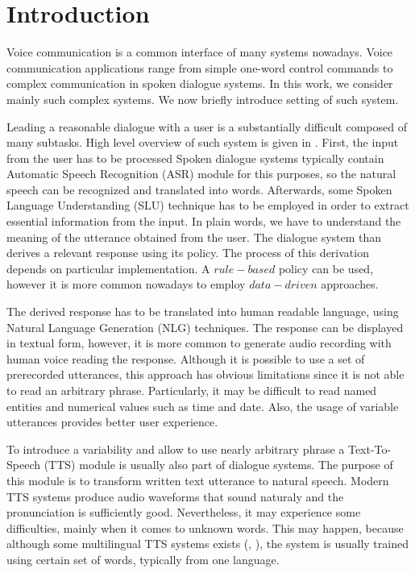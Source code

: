 \chapter{Introduction}
Voice communication is a common interface of many systems nowadays.
Voice communication applications range from simple one-word control commands to complex communication in spoken dialogue systems.
In this work, we consider mainly such complex systems.
We now briefly introduce setting of such system.
\par
Leading a reasonable dialogue with a user is a substantially difficult composed of many subtasks.
High level overview of such system is given in .
First, the input from the user has to be processed
Spoken dialogue systems typically contain Automatic Speech Recognition (ASR) module for this purposes, so the natural speech can be recognized and translated into words.
Afterwards, some Spoken Language Understanding (SLU) technique has to be employed in order to extract essential information from the input.
In plain words, we have to understand the meaning of the utterance obtained from the user.
The dialogue system than derives a relevant response using its policy.
The process of this derivation depends on particular implementation.
A $rule-based$ policy can be used, however it is more common nowadays to employ $data-driven$ approaches.
\par
The derived response has to be translated into human readable language, using Natural Language Generation (NLG) techniques.
The response can be displayed in textual form, however, it is more common to generate audio recording with human voice reading the response.
Although it is possible to use a set of prerecorded utterances, this approach has obvious limitations since it is not able to read an arbitrary phrase.
Particularly, it may be difficult to read named entities and numerical values such as time and date.
Also, the usage of variable utterances provides better user experience.
\par
To introduce a variability and allow to use nearly arbitrary phrase a Text-To-Speech (TTS) module is usually also part of dialogue systems.
The purpose of this module is to transform written text utterance to natural speech.
Modern TTS systems produce audio waveforms that sound naturaly and the pronunciation is sufficiently good.
Nevertheless, it may experience some difficulties, mainly when it comes to unknown words.
This may happen, because although some multilingual TTS systems exists (\cite{sproat1997multilingual}, \cite{miro2009multilingual}), the system is usually trained using certain set of words, typically from one language.
